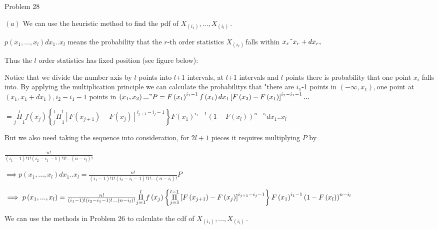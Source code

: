 \documentclass{article}
\begin{document}
\bigskip Problem 28

$\left( a\right) $ We can use the heuristic method to find the pdf of $%
X_{\left( i_{1}\right) },...,X_{\left( i_{l}\right) \ }.$

$p\left( x_{1},...,x_{l}\right) dx_{1}..x_{l}$ means the probability that
the $r$-th order statistics $X_{\left( i_{r}\right) \ }$falls within $x_{r}%
\symbol{126}x_{r}+dx_{r},$

Thus the $l$ order statistics has fixed position (see figure below)$:$


Notice that we divide the number axis by $l$ points into $l$+1 intervals, at 
$l$+1 intervals and $l$ points there is probability that one point $x_{i}$
falls into. By applying the multiplication principle we can calculate the
probabilitys that "there are $i_{1}$-1 points in $\left( -\infty
,x_{1}\right) ,$one point at $\left( x_{1},x_{1}+dx_{1}\right) ,i_{2}-i_{1}-1
$ points in $\left( x_{1},x_{2}\right) ..."P=F\left( x_{1}\right)
^{i_{1}-1}f\left( x_{1}\right) dx_{1}\left[ F\left( x_{2}\right) -F\left(
x_{1}\right) \right] ^{i_{2}-i_{1}-1}...$

$=\overset{l}{\underset{j=1}{\Pi }}f\left( x_{j}\right) \left\{ \overset{l-1}%
{\underset{j=1}{\Pi }}\left[ F\left( x_{j+1}\right) -F\left( x_{j}\right) %
\right] ^{i_{j+1}-i_{j}-1}\right\} F\left( x_{1}\right) ^{i_{1}-1}\left(
1-F\left( x_{l}\right) \right) ^{n-i_{l}}dx_{1}..x_{l}$

But we also need taking the sequence into consideration, for 2$l+1$ pieces
it requires multiplying $P$ by

$\frac{n!}{\left( i_{1}-1\right) !1!\left( i_{2}-i_{1}-1\right) !1!...\left(
n-i_{l}\right) !}$

$\implies p\left( x_{1},...,x_{l}\right) dx_{1}..x_{l}=\frac{n!}{\left(
i_{1}-1\right) !1!\left( i_{2}-i_{1}-1\right) !1!...\left( n-i_{l}\right) !}P
$

$\implies p\left( x_{1},...,x_{l}\right) =\frac{n!}{\left( i_{1}-1\right)
!\left( i_{2}-i_{1}-1\right) !...\left( n-i_{l}\right) !}\overset{l}{%
\underset{j=1}{\Pi }}f\left( x_{j}\right) \left\{ \overset{l-1}{\underset{j=1%
}{\Pi }}\left[ F\left( x_{j+1}\right) -F\left( x_{j}\right) \right]
^{i_{j+1}-i_{j}-1}\right\} F\left( x_{1}\right) ^{i_{1}-1}\left( 1-F\left(
x_{l}\right) \right) ^{n-i_{l}}$

We can use the methods in Problem 26 to calculate the cdf of $X_{\left(
i_{1}\right) },...,X_{\left( i_{l}\right) \ }.$
\end{document}
